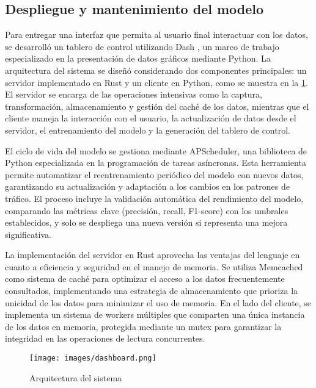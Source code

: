 \documentclass[12pt]{article}
\begin{document}

\subsection{Despliegue y mantenimiento del modelo}

Para entregar una interfaz que permita al usuario final interactuar con los datos, se desarrolló un tablero de control utilizando Dash \citep{dashboard2024}, un marco de trabajo especializado en la presentación de datos gráficos mediante Python. La arquitectura del sistema se diseñó considerando dos componentes principales: un servidor implementado en Rust y un cliente en Python, como se muestra en la \cref{fig:architecture}. El servidor se encarga de las operaciones intensivas como la captura, transformación, almacenamiento y gestión del caché de los datos, mientras que el cliente maneja la interacción con el usuario, la actualización de datos desde el servidor, el entrenamiento del modelo y la generación del tablero de control.

El ciclo de vida del modelo se gestiona mediante APScheduler, una biblioteca de Python especializada en la programación de tareas asíncronas. Esta herramienta permite automatizar el reentrenamiento periódico del modelo con nuevos datos, garantizando su actualización y adaptación a los cambios en los patrones de tráfico. El proceso incluye la validación automática del rendimiento del modelo, comparando las métricas clave (precisión, recall, F1-score) con los umbrales establecidos, y solo se despliega una nueva versión si representa una mejora significativa.

La implementación del servidor en Rust aprovecha las ventajas del lenguaje en cuanto a eficiencia y seguridad en el manejo de memoria. Se utiliza Memcached como sistema de caché para optimizar el acceso a los datos frecuentemente consultados, implementando una estrategia de almacenamiento que prioriza la unicidad de los datos para minimizar el uso de memoria. En el lado del cliente, se implementa un sistema de workers múltiples que comparten una única instancia de los datos en memoria, protegida mediante un mutex para garantizar la integridad en las operaciones de lectura concurrentes.

\begin{figure}[H]
    \centering
    \texttt{[image: images/dashboard.png]}
    \caption{Arquitectura del sistema}
    \label{fig:architecture}
\end{figure}
\end{document}
